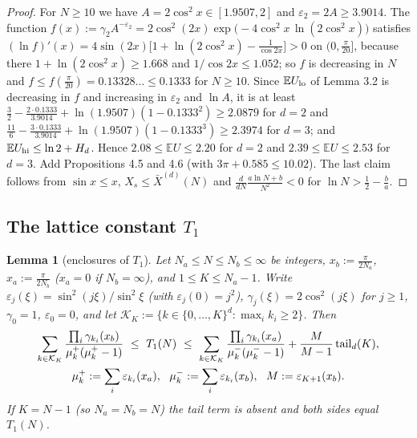 \documentclass[11pt,a4paper]{article}
\newtheorem{lemma}[theorem]{Lemma}
\theoremstyle{definition}
\theoremstyle{remark}
\begin{document}
\begin{proof}
For $N\ge10$ we have $A=2\cos^2x\in[1.9507,2]$ and $\varepsilon_2=2A\ge3.9014$. The function $f(x):=\gamma_2A^{-\varepsilon_2}=2\cos^2(2x)\exp\bigl(-4\cos^2x\,\ln(2\cos^2x)\bigr)$ satisfies $(\ln f)'(x)=4\sin(2x)\bigl[1+\ln(2\cos^2x)-\frac{1}{\cos2x}\bigr]>0$ on $(0,\frac\pi{20}]$, because there $1+\ln(2\cos^2x)\ge1.668$ and $1/\cos2x\le1.052$; so $f$ is decreasing in $N$ and $f\le f(\frac{\pi}{20})=0.13328\ldots\le0.1333$ for $N\ge10$. Since $\mathbb EU_{\rm lo}$ of Lemma 3.2 is decreasing in $f$ and increasing in $\varepsilon_2$ and $\ln A$, it is at least $\frac32-\frac{2\cdot0.1333}{3.9014}+\ln(1.9507)(1-0.1333^2)\ge2.0879$ for $d=2$ and $\frac{11}{6}-\frac{3\cdot0.1333}{3.9014}+\ln(1.9507)(1-0.1333^3)\ge2.3974$ for $d=3$; and $\mathbb EU_{\rm hi}\le\ln2+H_d$. Hence $2.08\le\mathbb EU\le2.20$ for $d=2$ and $2.39\le\mathbb EU\le2.53$ for $d=3$. Add Propositions 4.5 and 4.6 (with $3\pi+0.585\le10.02$). The last claim follows from $\sin x\le x$, $X_s\le\bar X^{(d)}(N)$ and $\frac{d}{dN}\frac{a\ln N+b}{N^2}<0$ for $\ln N>\frac12-\frac ba$.
\end{proof}

\subsection{The lattice constant $T_1$}

\begin{lemma}[{enclosures of $T_1$}]
Let $N_a\le N\le N_b\le\infty$ be integers, $x_b:=\frac{\pi}{2N_a}$, $x_a:=\frac{\pi}{2N_b}$ ($x_a=0$ if $N_b=\infty$), and $1\le K\le N_a-1$. Write $\varepsilon_j(\xi)=\sin^2(j\xi)/\sin^2\xi$ (with $\varepsilon_j(0)=j^2$), $\gamma_j(\xi)=2\cos^2(j\xi)$ for $j\ge1$, $\gamma_0=1$, $\varepsilon_0=0$, and let $\mathcal K_K:=\{k\in\{0,\dots,K\}^d:\max_ik_i\ge2\}$. Then
\begin{gather*}
\sum_{k\in\mathcal K_K}\frac{\prod_i\gamma_{k_i}(x_b)}{\mu_k^{+}(\mu_k^{+}-1)}\ \le\ T_1(N)\ \le\ \sum_{k\in\mathcal K_K}\frac{\prod_i\gamma_{k_i}(x_a)}{\mu_k^{-}(\mu_k^{-}-1)}+\frac{M}{M-1}\,{\rm tail}_d(K), \\
\mu_k^{+}:=\sum_i\varepsilon_{k_i}(x_a),\ \ \mu_k^{-}:=\sum_i\varepsilon_{k_i}(x_b),\ \ M:=\varepsilon_{K+1}(x_b).
\end{gather*}
If $K=N-1$ (so $N_a=N_b=N$) the tail term is absent and both sides equal $T_1(N)$.
\end{lemma}
\end{document}
